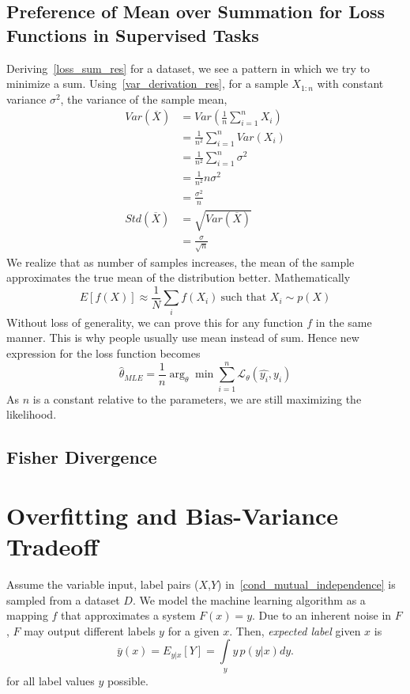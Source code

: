 \documentclass{book}
\numberwithin{equation}{subsection}
\begin{document}
\subsection{Preference of Mean over Summation for Loss Functions in Supervised Tasks}
\label{mean_loss}
Deriving~\ref{loss_sum_res} for a dataset, we see a pattern in which we try to minimize a sum.
Using~\ref{var_derivation_res}, for a sample $X_{1:n}$ with constant variance $\sigma^2$, the variance of the sample mean,
\begin{align}
    Var(\overline{X}) &= Var(\frac{1}{n}\sum_{i=1}^{n} X_i)\\
    &= \frac{1}{n^2} \sum_{i=1}^{n} Var(X_i)\\
    &= \frac{1}{n^2} \sum_{i=1}^{n} \sigma^2\\
    &= \frac{1}{n^2} n \sigma^2\\
    &= \frac{\sigma^2}{n}\\
    Std(\overline{X}) &= \sqrt{Var(\overline{X})}\\
    &= \frac{\sigma}{\sqrt{n}}
\end{align}
We realize that as number of samples increases, the mean of the sample approximates the true mean of the distribution better. Mathematically
\begin{equation}
    E[f(X)] \approx \frac{1}{N}\sum_i f(X_i)\ \text{such that $X_i \sim p(X)$}\label{mean_loss_res}
\end{equation}
Without loss of generality, we can prove this for any function $f$ in the same manner. This is why people usually use mean instead of sum. Hence new expression for the loss function becomes
\begin{equation}
    \hat{\theta}_{MLE} = \frac{1}{n}\arg_\theta \min \sum_{i=1}^n \mathcal{L}_\theta(\hat{y_i},y_i)
\end{equation}
As $n$ is a constant relative to the parameters, we are still maximizing the likelihood.
\subsection{Fisher Divergence}

\section{Overfitting and Bias-Variance Tradeoff}

Assume the variable input, label pairs ($X$,$Y$) in~\ref{cond_mutual_independence} is sampled from a dataset $D$. We model the machine learning algorithm as a mapping $f$ that approximates a system $F(x)=y$. Due to an inherent noise in $F$, $F$ may output different labels $y$ for a given $x$. Then, \textit{expected label} given $x$ is
\begin{equation}
    \bar{y}(x) = E_{y \vert x} \left[Y\right] = \int\limits_y y \, p(y \vert x) dy.
\end{equation}
for all label values $y$ possible.
\end{document}
